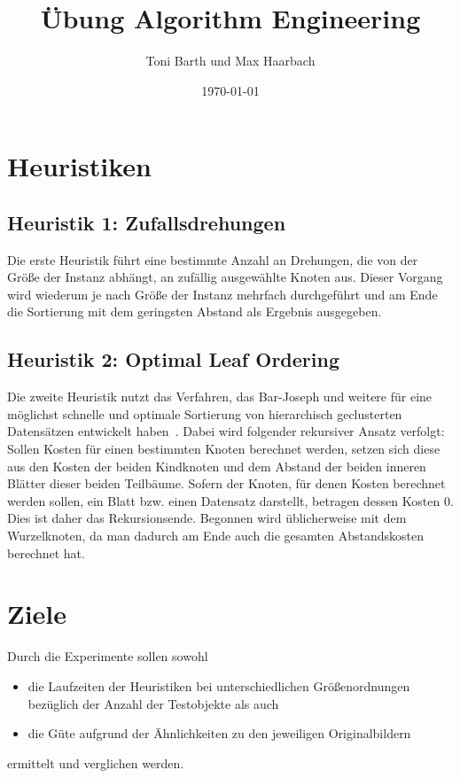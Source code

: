 \documentclass[a4paper, 10pt, twoside, onecolumn, parskip]{scrartcl}
\title{Übung Algorithm Engineering} %
\author{{Toni Barth} und {Max Haarbach}} %
\date{\today}            %
\begin{document}
    \maketitle                %

    \section{Heuristiken} \label{sec:heuristiken}

    \subsection{Heuristik 1: Zufallsdrehungen} \label{subsec:heuristic1}

    Die erste Heuristik führt eine bestimmte Anzahl an Drehungen, die von der Größe der Instanz abhängt, an zufällig ausgewählte Knoten aus.
    Dieser Vorgang wird wiederum je nach Größe der Instanz mehrfach durchgeführt und am Ende die Sortierung mit dem geringsten Abstand als Ergebnis ausgegeben.

    \subsection{Heuristik 2: Optimal Leaf Ordering} \label{subsec:heuristic2}

    Die zweite Heuristik nutzt das Verfahren, das Bar-Joseph und weitere für eine möglichst schnelle und optimale Sortierung von hierarchisch geclusterten Datensätzen entwickelt haben~\cite{bar2001fast}.
    Dabei wird folgender rekursiver Ansatz verfolgt:
    Sollen Kosten für einen bestimmten Knoten berechnet werden, setzen sich diese aus den Kosten der beiden Kindknoten und dem Abstand der beiden inneren Blätter dieser beiden Teilbäume.
    Sofern der Knoten, für denen Kosten berechnet werden sollen, ein Blatt bzw. einen Datensatz darstellt, betragen dessen Kosten $0$.
    Dies ist daher das Rekursionsende.
    Begonnen wird üblicherweise mit dem Wurzelknoten, da man dadurch am Ende auch die gesamten Abstandskosten berechnet hat.

    \section{Ziele} \label{sec:ziele}

    Durch die Experimente sollen sowohl
    \begin{itemize}
        \item die Laufzeiten der Heuristiken bei unterschiedlichen Größenordnungen bezüglich der Anzahl der Testobjekte als auch
        \item die Güte aufgrund der Ähnlichkeiten zu den jeweiligen Originalbildern
    \end{itemize}
    ermittelt und verglichen werden.
\end{document}

